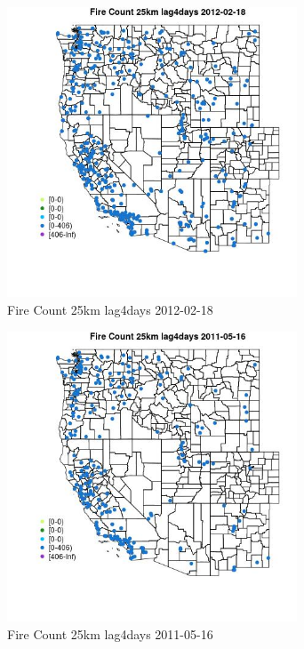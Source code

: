 \begin{figure} 
\centering  
\includegraphics[width=0.77\textwidth]{Code_Outputs/Report_ML_input_PM25_Step4_part_f_de_duplicated_aves_prioritize_24hr_obswNAs_MapObsFire_Count_25km_lag4days2012-02-18.jpg} 
\caption{\label{fig:Report_ML_input_PM25_Step4_part_f_de_duplicated_aves_prioritize_24hr_obswNAsMapObsFire_Count_25km_lag4days2012-02-18}Fire Count 25km lag4days 2012-02-18} 
\end{figure} 
 

\begin{figure} 
\centering  
\includegraphics[width=0.77\textwidth]{Code_Outputs/Report_ML_input_PM25_Step4_part_f_de_duplicated_aves_prioritize_24hr_obswNAs_MapObsFire_Count_25km_lag4days2011-05-16.jpg} 
\caption{\label{fig:Report_ML_input_PM25_Step4_part_f_de_duplicated_aves_prioritize_24hr_obswNAsMapObsFire_Count_25km_lag4days2011-05-16}Fire Count 25km lag4days 2011-05-16} 
\end{figure} 
 

